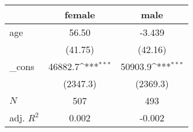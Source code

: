{
\def\sym#1{\ifmmode^{#1}\else\(^{#1}\)\fi}
\begin{tabular}{l*{2}{c}}
\hline\hline
            &\multicolumn{1}{c}{female}&\multicolumn{1}{c}{male}\\
\hline
age         &       56.50         &      -3.439         \\
            &     (41.75)         &     (42.16)         \\
[1em]
\_cons      &     46882.7\sym{***}&     50903.9\sym{***}\\
            &    (2347.3)         &    (2369.3)         \\
\hline
\(N\)       &         507         &         493         \\
adj. \(R^{2}\)&       0.002         &      -0.002         \\
\hline\hline
\end{tabular}
}
